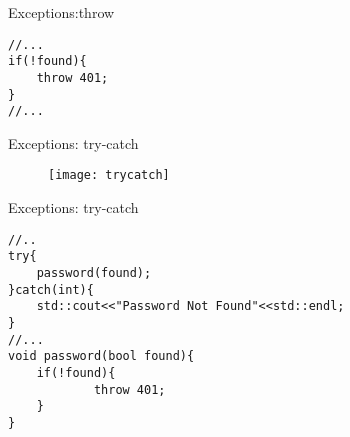 \documentclass[xcolor={dvipsnames}]{beamer}
\begin{document}
\begin{frame}[fragile]{Exceptions:throw}
\begin{verbatim}
//...
if(!found){
    throw 401;
}
//...
\end{verbatim}
\end{frame}

\begin{frame}{Exceptions: try-catch}
\begin{center}	
	\begin{figure}
		\texttt{[image: trycatch]}
	\end{figure}
\end{center}
\end{frame}


\begin{frame}[fragile]{Exceptions: try-catch}
\begin{verbatim}
//..
try{
   	password(found);
}catch(int){
    std::cout<<"Password Not Found"<<std::endl;
}
//...
void password(bool found){
    if(!found){
        	throw 401;
    }
}
\end{verbatim}
\end{frame}
\end{document}
